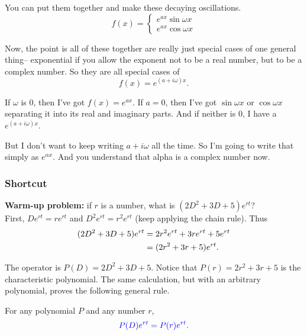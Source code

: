 You can put them together and make these decaying oscillations.
\begin{equation*}
  f(x) =  \left\{
    \begin{array}{rl}
      e^{ax } \sin \omega x \\
      e^{ax} \cos \omega x
    \end{array} \right. 
\end{equation*}

Now, the point is all of these together are really just special cases of one general thing--
exponential if you allow the exponent not to be a real number, but to be a complex number.
So they are all special cases of
\begin{equation*}
  f(x) = e^{(a + i \omega) x}. 
\end{equation*}

If $\omega$ is $0$, then I've got $f(x) = e^{ax}$.
If $a = 0$, then I've got $\sin \omega x$ or $\cos \omega x$ separating it into its real and imaginary parts.
And if neither is $0$, I have a $e^{(a + i \omega) x}$.

But I don't want to keep writing $a + i \omega$ all the time.
So I'm going to write that simply as $e^{\alpha x}$.
And you understand that alpha is a complex number now.

\clearpage
\subsubsection{Shortcut}

\textbf{Warm-up problem: } if $r$ is a number, what is $(2D^2+3D+5) e^{rt}$?\\
\Solution First, $D e^{rt} = r e^{rt}$ and $D^2 e^{rt} = r^2 e^{rt}$ (keep applying the chain rule). Thus
\begin{align*}
  \displaystyle  (2D^2+3D+5) e^{rt}  \displaystyle &= 2 r^2 e^{rt} + 3 r e^{rt} + 5 e^{rt} \\
  \displaystyle &= (2r^2+3r+5) e^{rt}.
\end{align*}

The operator is $P(D) = 2D^2+3D+5$. Notice that $P(r) = 2r^2+3r+5$
is the characteristic polynomial. The same calculation, but with an arbitrary polynomial, proves the following general rule.

\begin{theorem}
  For any polynomial $P$ and any number $r$,
  \begin{equation*}
    {\color{blue}{P(D) e^{rt} = P(r) e^{rt}.}}
  \end{equation*}
\end{theorem}

